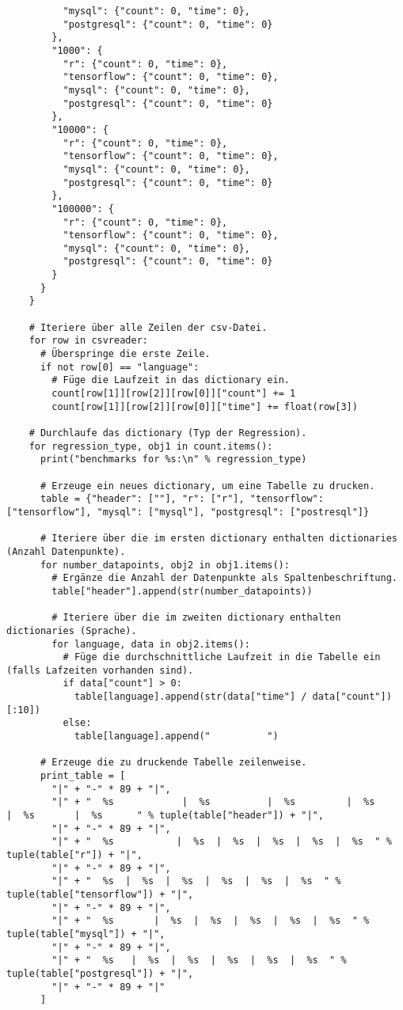 \begin{verbatim}
          "mysql": {"count": 0, "time": 0},
          "postgresql": {"count": 0, "time": 0}
        },
        "1000": {
          "r": {"count": 0, "time": 0},
          "tensorflow": {"count": 0, "time": 0},
          "mysql": {"count": 0, "time": 0},
          "postgresql": {"count": 0, "time": 0}
        },
        "10000": {
          "r": {"count": 0, "time": 0},
          "tensorflow": {"count": 0, "time": 0},
          "mysql": {"count": 0, "time": 0},
          "postgresql": {"count": 0, "time": 0}
        },
        "100000": {
          "r": {"count": 0, "time": 0},
          "tensorflow": {"count": 0, "time": 0},
          "mysql": {"count": 0, "time": 0},
          "postgresql": {"count": 0, "time": 0}
        }
      }
    }

    # Iteriere über alle Zeilen der csv-Datei.
    for row in csvreader:
      # Überspringe die erste Zeile.
      if not row[0] == "language":
        # Füge die Laufzeit in das dictionary ein.
        count[row[1]][row[2]][row[0]]["count"] += 1
        count[row[1]][row[2]][row[0]]["time"] += float(row[3])

    # Durchlaufe das dictionary (Typ der Regression).
    for regression_type, obj1 in count.items():
      print("benchmarks for %s:\n" % regression_type)

      # Erzeuge ein neues dictionary, um eine Tabelle zu drucken.
      table = {"header": [""], "r": ["r"], "tensorflow": ["tensorflow"], "mysql": ["mysql"], "postgresql": ["postresql"]}

      # Iteriere über die im ersten dictionary enthalten dictionaries (Anzahl Datenpunkte).
      for number_datapoints, obj2 in obj1.items():
        # Ergänze die Anzahl der Datenpunkte als Spaltenbeschriftung.
        table["header"].append(str(number_datapoints))

        # Iteriere über die im zweiten dictionary enthalten dictionaries (Sprache).
        for language, data in obj2.items():
          # Füge die durchschnittliche Laufzeit in die Tabelle ein (falls Lafzeiten vorhanden sind).
          if data["count"] > 0:
            table[language].append(str(data["time"] / data["count"])[:10])
          else:
            table[language].append("          ")

      # Erzeuge die zu druckende Tabelle zeilenweise.
      print_table = [
        "|" + "-" * 89 + "|",
        "|" + "  %s            |  %s          |  %s         |  %s        |  %s       |  %s      " % tuple(table["header"]) + "|",
        "|" + "-" * 89 + "|",
        "|" + "  %s           |  %s  |  %s  |  %s  |  %s  |  %s  " % tuple(table["r"]) + "|",
        "|" + "-" * 89 + "|",
        "|" + "  %s  |  %s  |  %s  |  %s  |  %s  |  %s  " % tuple(table["tensorflow"]) + "|",
        "|" + "-" * 89 + "|",
        "|" + "  %s       |  %s  |  %s  |  %s  |  %s  |  %s  " % tuple(table["mysql"]) + "|",
        "|" + "-" * 89 + "|",
        "|" + "  %s   |  %s  |  %s  |  %s  |  %s  |  %s  " % tuple(table["postgresql"]) + "|",
        "|" + "-" * 89 + "|"
      ]


\end{verbatim}
